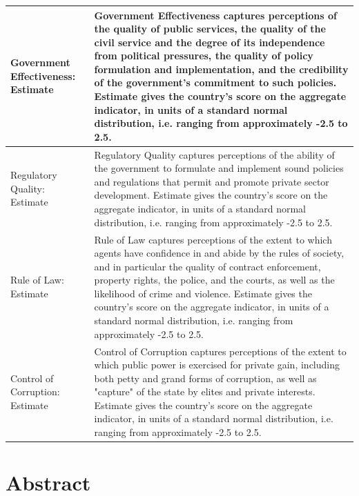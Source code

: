 \documentclass[
]{article}
\begin{document}
\begin{longtable}{p{} p{}}
Government Effectiveness: Estimate 
&
Government Effectiveness captures perceptions of the quality of public services, the quality of the civil service and the degree of its independence from political pressures, the quality of policy formulation and implementation, and the credibility of the government's commitment to such policies. Estimate gives the country's score on the aggregate indicator, in units of a standard normal distribution, i.e. ranging from approximately -2.5 to 2.5. \\
\hline

Regulatory Quality: Estimate 
&
Regulatory Quality captures perceptions of the ability of the government to formulate and implement sound policies and regulations that permit and promote private sector development. Estimate gives the country's score on the aggregate indicator, in units of a standard normal distribution, i.e. ranging from approximately -2.5 to 2.5. \\
\hline

Rule of Law: Estimate 
&
Rule of Law captures perceptions of the extent to which agents have confidence in and abide by the rules of society, and in particular the quality of contract enforcement, property rights, the police, and the courts, as well as the likelihood of crime and violence. Estimate gives the country's score on the aggregate indicator, in units of a standard normal distribution, i.e. ranging from approximately -2.5 to 2.5. \\
\hline

Control of Corruption: Estimate 
&
Control of Corruption captures perceptions of the extent to which public power is exercised for private gain, including both petty and grand forms of corruption, as well as "capture" of the state by elites and private interests. Estimate gives the country's score on the aggregate indicator, in units of a standard normal distribution, i.e. ranging from approximately -2.5 to 2.5. \\
\hline

\end{longtable}

\section{Abstract}\label{abstract}
\end{document}

